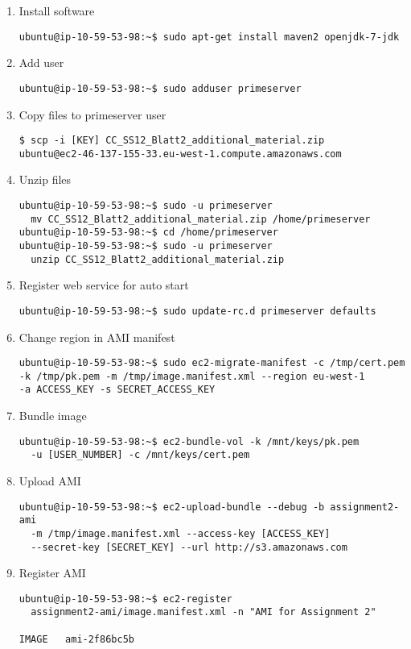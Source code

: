 \documentclass{article}
\begin{document}
\begin{enumerate}
	\item Install software
\begin{verbatim}
ubuntu@ip-10-59-53-98:~$ sudo apt-get install maven2 openjdk-7-jdk
\end{verbatim}

	\item Add user
\begin{verbatim}
ubuntu@ip-10-59-53-98:~$ sudo adduser primeserver
\end{verbatim}

	\item Copy files to primeserver user
\begin{verbatim}
$ scp -i [KEY] CC_SS12_Blatt2_additional_material.zip 
ubuntu@ec2-46-137-155-33.eu-west-1.compute.amazonaws.com
\end{verbatim}

	\item Unzip files
\begin{verbatim}
ubuntu@ip-10-59-53-98:~$ sudo -u primeserver 
  mv CC_SS12_Blatt2_additional_material.zip /home/primeserver
ubuntu@ip-10-59-53-98:~$ cd /home/primeserver
ubuntu@ip-10-59-53-98:~$ sudo -u primeserver 
  unzip CC_SS12_Blatt2_additional_material.zip
\end{verbatim}

	\item Register web service for auto start
\begin{verbatim}
ubuntu@ip-10-59-53-98:~$ sudo update-rc.d primeserver defaults
\end{verbatim}

	\item Change region in AMI manifest
\begin{verbatim}
ubuntu@ip-10-59-53-98:~$ sudo ec2-migrate-manifest -c /tmp/cert.pem 
-k /tmp/pk.pem -m /tmp/image.manifest.xml --region eu-west-1 
-a ACCESS_KEY -s SECRET_ACCESS_KEY
\end{verbatim}

	\item Bundle image
\begin{verbatim}
ubuntu@ip-10-59-53-98:~$ ec2-bundle-vol -k /mnt/keys/pk.pem 
  -u [USER_NUMBER] -c /mnt/keys/cert.pem
\end{verbatim}

	\item Upload AMI
\begin{verbatim}
ubuntu@ip-10-59-53-98:~$ ec2-upload-bundle --debug -b assignment2-ami 
  -m /tmp/image.manifest.xml --access-key [ACCESS_KEY] 
  --secret-key [SECRET_KEY] --url http://s3.amazonaws.com
\end{verbatim}

	\item Register AMI
\begin{verbatim}
ubuntu@ip-10-59-53-98:~$ ec2-register 
  assignment2-ami/image.manifest.xml -n "AMI for Assignment 2"

IMAGE	ami-2f86bc5b
\end{verbatim}
\end{enumerate}
\end{document}
